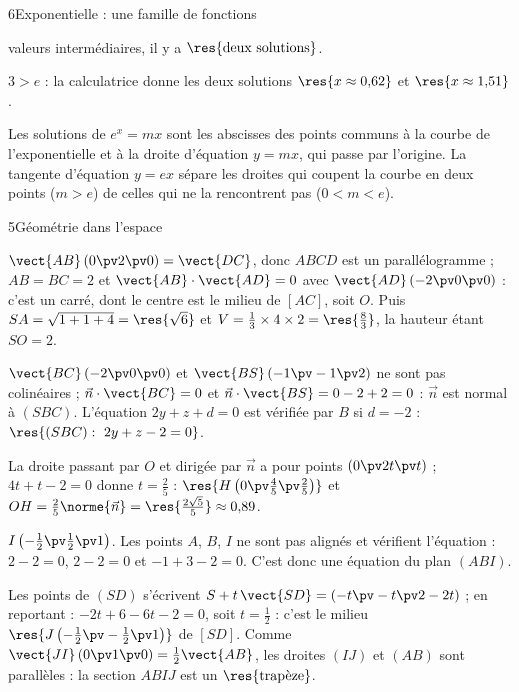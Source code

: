 \begin{corrigeBac}{6}{Exponentielle : une famille de fonctions}
\begin{questions}[resume]
\begin{itemize}[leftmargin=1.2em,itemsep=0.3mm,topsep=0.5mm]
        valeurs intermédiaires, il y a $\res{\text{deux solutions}}$.
    \end{itemize}
  \item $3>e$ : la calculatrice donne les deux solutions $\res{x\approx0{,}62}$ et $\res{x\approx1{,}51}$. 
  \item Les solutions de $e^{x}=mx$ sont les abscisses des points communs à la courbe de l'exponentielle et à la droite d'équation
    $y=mx$, qui passe par l'origine. La tangente d'équation $y=ex$ sépare les droites qui coupent la courbe en deux points ($m>e$) de
    celles qui ne la rencontrent pas ($0<m<e$). 
\end{questions}
\end{corrigeBac}

\begin{corrigeBac}{5}{Géométrie dans l'espace}
\begin{questions}
  \item $\vect{AB}\,(0\pv2\pv0)=\vect{DC}$, donc $ABCD$ est un parallélogramme ; $AB=BC=2$ et $\vect{AB}\cdot\vect{AD}=0$ avec
    $\vect{AD}\,(-2\pv0\pv0)$ : c'est un carré, dont le centre est le milieu de $[AC]$, soit $O$. Puis $SA=\sqrt{1+1+4}=\res{\sqrt6}$ et
    $V=\frac13\times4\times2=\res{\tfrac83}$, la hauteur étant $SO=2$. \pts{1 pt}
  \item $\vect{BC}\,(-2\pv0\pv0)$ et $\vect{BS}\,(-1\pv-1\pv2)$ ne sont pas colinéaires ; $\vec n\cdot\vect{BC}=0$ et
    $\vec n\cdot\vect{BS}=0-2+2=0$ : $\vec n$ est normal à $(SBC)$. L'équation $2y+z+d=0$ est vérifiée par $B$ si $d=-2$ :
    $\res{(SBC):\ 2y+z-2=0}$. \pts{1 pt}
  \item La droite passant par $O$ et dirigée par $\vec n$ a pour points $(0\pv2t\pv t)$ ; $4t+t-2=0$ donne $t=\frac25$ :
    $\res{H\left(0\pv\tfrac45\pv\tfrac25\right)}$ et $OH=\frac25\norme{\vec n}=\res{\tfrac{2\sqrt5}{5}}\approx0{,}89$. \pts{1 pt}
  \item $I\left(-\frac12\pv\frac12\pv1\right)$. Les points $A$, $B$, $I$ ne sont pas alignés et vérifient l'équation : $2-2=0$, $2-2=0$ et
    $-1+3-2=0$. C'est donc une équation du plan $(ABI)$. 
  \item Les points de $(SD)$ s'écrivent $S+t\,\vect{SD}=(-t\pv-t\pv2-2t)$ ; en reportant : $-2t+6-6t-2=0$, soit $t=\frac12$ : c'est le
    milieu $\res{J\left(-\tfrac12\pv-\tfrac12\pv1\right)}$ de $[SD]$. Comme $\vect{JI}\,(0\pv1\pv0)=\frac12\vect{AB}$, les droites $(IJ)$ et
    $(AB)$ sont parallèles : la section $ABIJ$ est un $\res{\text{trapèze}}$. 
\end{questions}
\end{corrigeBac}

